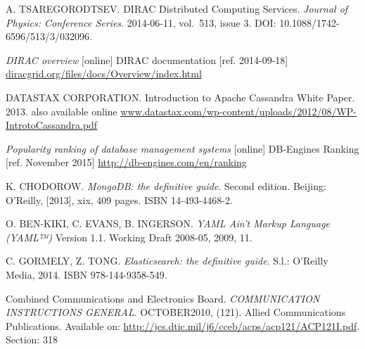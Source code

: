 \begin{thebibliography}{99}
	A. TSAREGORODTSEV.
	DIRAC Distributed Computing Services. 
	\textit{Journal of Physics: Conference Series}. 2014-06-11, vol.~513, issue 3. 
	DOI: 10.1088/1742-6596/513/3/032096. 

	\emph{DIRAC overview} [online] 
	DIRAC documentation [ref. 2014-09-18]
	\url{diracgrid.org/files/docs/Overview/index.html}

	DATASTAX CORPORATION. Introduction to Apache Cassandra White Paper. 2013.
	also available online \url{www.datastax.com/wp-content/uploads/2012/08/WP-IntrotoCassandra.pdf}
	
	\emph{Popularity ranking of database management systems} [online]
	DB-Engines Ranking [ref. November 2015]
	\url{http://db-engines.com/en/ranking} 
	
	K. CHODOROW. \textit{MongoDB: the definitive guide}. Second edition. 
	Beijing: O'Reilly, [2013], xix, 409 pages. ISBN 14-493-4468-2. 
	
	O. BEN-KIKI, C. EVANS, B. INGERSON. \textit{YAML Ain't Markup Language (YAML™)} 
	Version 1.1. Working Draft 2008-05, 2009, 11.	
	
	C. GORMELY, Z. TONG. \textit{Elasticsearch: the definitive guide}. S.l.: 
	O'Reilly Media, 2014. ISBN 978-144-9358-549. 
	
	Combined Communications and Electronics Board. 
	\textit{COMMUNICATION INSTRUCTIONS GENERAL}. OCTOBER2010, (121). 
	Allied Communications Publications. 
	Available on: \url{http://jcs.dtic.mil/j6/cceb/acps/acp121/ACP121I.pdf}.
	Section: 318
	
\end{thebibliography}